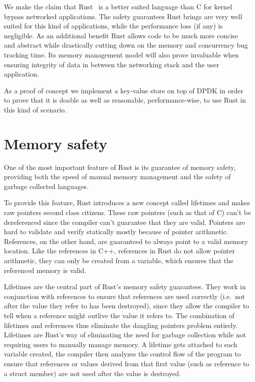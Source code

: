 We make the claim that Rust~\cite{rustbook} is a better suited
language than C for kernel bypass networked applications. The safety
guarantees Rust brings are very well suited for this kind of
applications, while the performance loss (if any) is negligible. As an
additional benefit Rust allows code to be much more concise and
abstract while drastically cutting down on the memory and concurrency
bug tracking time. Its memory management model will also prove
invaluable when ensuring integrity of data in between the networking
stack and the user application.

As a proof of concept we implement a key-value store on top of
DPDK in order to prove that it is doable as well as reasonable,
performance-wise, to use Rust in this kind of scenario.


\section{Memory safety}

One of the most important feature of Rust is its guarantee of memory
safety, providing both the speed of manual memory management and the
safety of garbage collected languages.

To provide this feature, Rust introduces a new concept called
lifetimes and makes raw pointers second class citizens. These raw
pointers (such as that of C) can't be dereferenced since the compiler
can't guarantee that they are valid. Pointers are hard to validate and
verify statically mostly because of pointer arithmetic. References, on
the other hand, are guaranteed to always point to a valid memory
location. Like the references in C++, references in Rust do not allow
pointer arithmetic, they can only be created from a variable, which
ensures that the referenced memory is valid.

Lifetimes are the central part of Rust's memory safety
guarantees. They work in conjunction with references to ensure
that references are used correctly (i.e.\ not after the value they
refer to has been destroyed), since they allow the compiler to tell
when a reference might outlive the value it refers to. The combination
of lifetimes and references thus eliminate the dangling pointers
problem entirely. Lifetimes are Rust's way of eliminating the need for
garbage collection while not requiring users to manually manage
memory. A lifetime gets attached to each variable created, the
compiler then analyzes the control flow of the program to ensure that
references or values derived from that first value (such as reference
to a struct member) are not used after the value is destroyed.

